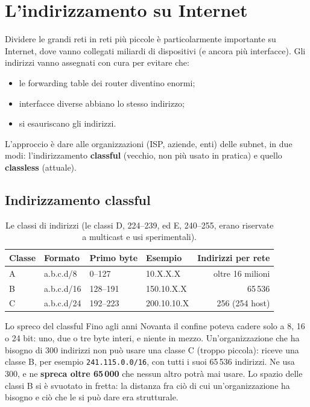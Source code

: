 \section{L'indirizzamento su Internet}

Dividere le grandi reti in reti più piccole è particolarmente importante su Internet, dove vanno collegati miliardi di
dispositivi (e ancora più interfacce). Gli indirizzi vanno assegnati con cura per evitare che:

\begin{itemize}
    \item le forwarding table dei router diventino enormi;
    \item interfacce diverse abbiano lo stesso indirizzo;
    \item si esauriscano gli indirizzi.
\end{itemize}

L'approccio è dare alle organizzazioni (ISP, aziende, enti) delle subnet, in due modi: l'indirizzamento
\textbf{classful} (vecchio, non più usato in pratica) e quello \textbf{classless} (attuale).

\subsection{Indirizzamento classful}

\begin{table}[H]
\centering
\begin{tabular}{llllr}
\toprule
\textbf{Classe} & \textbf{Formato} & \textbf{Primo byte} & \textbf{Esempio} & \textbf{Indirizzi per rete} \\
\midrule
A & a.b.c.d/8 & 0--127 & 10.X.X.X & oltre 16 milioni \\
B & a.b.c.d/16 & 128--191 & 150.10.X.X & 65\,536 \\
C & a.b.c.d/24 & 192--223 & 200.10.10.X & 256 (254 host) \\
\bottomrule
\end{tabular}
\caption{Le classi di indirizzi (le classi D, 224--239, ed E, 240--255, erano riservate a multicast e usi sperimentali).}
\end{table}

\begin{esempio}{Lo spreco del classful}
Fino agli anni Novanta il confine poteva cadere solo a 8, 16 o 24 bit: uno, due o tre byte interi, e niente in mezzo.
Un'organizzazione che ha bisogno di 300 indirizzi non può usare una classe C (troppo piccola): riceve una classe B, per
esempio \texttt{241.115.0.0/16}, con tutti i suoi 65\,536 indirizzi. Ne usa 300, e ne \textbf{spreca oltre 65\,000} che
nessun altro potrà mai usare. Lo spazio delle classi B si è svuotato in fretta: la distanza fra ciò di cui
un'organizzazione ha bisogno e ciò che le si può dare era strutturale.
\end{esempio}

